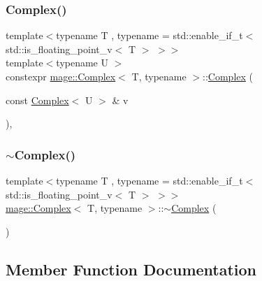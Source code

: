 \mbox{\label{structmage_1_1_complex_a1827aee389c671924710946eaeb0a326}} 
\subsubsection{\texorpdfstring{Complex()}{Complex()}\hspace{0.1cm}{\footnotesize\ttfamily [5/5]}}
{\footnotesize\ttfamily template$<$typename T , typename  = std\+::enable\+\_\+if\+\_\+t$<$ std\+::is\+\_\+floating\+\_\+point\+\_\+v$<$ T $>$ $>$$>$ \\
template$<$typename U $>$ \\
constexpr \mbox{\hyperlink{structmage_1_1_complex}{mage\+::\+Complex}}$<$ T, typename $>$\+::\mbox{\hyperlink{structmage_1_1_complex}{Complex}} (\begin{DoxyParamCaption}\item[{const \mbox{\hyperlink{structmage_1_1_complex}{Complex}}$<$ U $>$ \&}]{v }\end{DoxyParamCaption})\hspace{0.3cm}{\ttfamily [explicit]}, {\ttfamily [noexcept]}}

\mbox{\label{structmage_1_1_complex_a82b417379ea4178ed43814b35c6101fb}} 
\subsubsection{\texorpdfstring{$\sim$\+Complex()}{~Complex()}}
{\footnotesize\ttfamily template$<$typename T , typename  = std\+::enable\+\_\+if\+\_\+t$<$ std\+::is\+\_\+floating\+\_\+point\+\_\+v$<$ T $>$ $>$$>$ \\
\mbox{\hyperlink{structmage_1_1_complex}{mage\+::\+Complex}}$<$ T, typename $>$\+::$\sim$\mbox{\hyperlink{structmage_1_1_complex}{Complex}} (\begin{DoxyParamCaption}{ }\end{DoxyParamCaption})\hspace{0.3cm}{\ttfamily [default]}}



\subsection{Member Function Documentation}
\mbox{\label{structmage_1_1_complex_a75c16f2723130ef95c87a7255a8d72f9}} 
